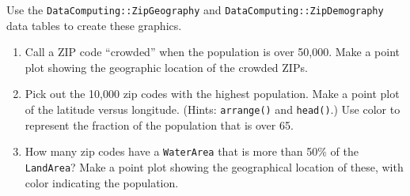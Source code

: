 \documentclass[
  letterpaper,
  DIV=11,
  numbers=noendperiod,
  oneside]{scrartcl}
\providecommand{\tightlist}{%
  \setlength{\itemsep}{0pt}\setlength{\parskip}{0pt}}\usepackage{longtable,booktabs,array}
\begin{document}
\begin{tcolorbox}[enhanced jigsaw, colbacktitle=quarto-callout-note-color!10!white, opacityback=0, breakable, opacitybacktitle=0.6, colback=white, coltitle=black, arc=.35mm, title=\textcolor{quarto-callout-note-color}{\faInfo}\hspace{0.5em}{Exercise 5.34 kid-bend-dish}, left=2mm, colframe=quarto-callout-note-color-frame, rightrule=.15mm, bottomrule=.15mm, leftrule=.75mm, bottomtitle=1mm, toptitle=1mm, titlerule=0mm, toprule=.15mm]

Use the \texttt{DataComputing::ZipGeography} and
\texttt{DataComputing::ZipDemography} data tables to create these
graphics.

\begin{enumerate}
\tightlist
\item
  Call a ZIP code ``crowded'' when the population is over 50,000. Make a
  point plot showing the geographic location of the crowded ZIPs.\\
\item
  Pick out the 10,000 zip codes with the highest population. Make a
  point plot of the latitude versus longitude. (Hints:
  \texttt{arrange()} and \texttt{head()}.) Use color to represent the
  fraction of the population that is over 65.\\
\item
  How many zip codes have a \texttt{WaterArea} that is more than 50\% of
  the \texttt{LandArea}? Make a point plot showing the geographical
  location of these, with color indicating the population.
\end{enumerate}

\end{tcolorbox}
\end{document}
